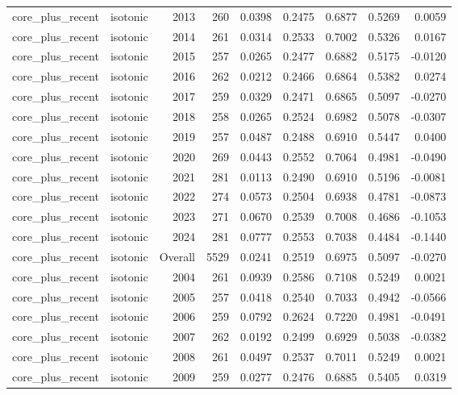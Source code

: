 \begin{table}[t]
\begin{tabular}{@{} l l r r r r r r r @{} }
      core\_plus\_recent & isotonic & 2013 & 260 & 0.0398 & 0.2475 & 0.6877 & 0.5269 & 0.0059 \\
      core\_plus\_recent & isotonic & 2014 & 261 & 0.0314 & 0.2533 & 0.7002 & 0.5326 & 0.0167 \\
      core\_plus\_recent & isotonic & 2015 & 257 & 0.0265 & 0.2477 & 0.6882 & 0.5175 & -0.0120 \\
      core\_plus\_recent & isotonic & 2016 & 262 & 0.0212 & 0.2466 & 0.6864 & 0.5382 & 0.0274 \\
      core\_plus\_recent & isotonic & 2017 & 259 & 0.0329 & 0.2471 & 0.6865 & 0.5097 & -0.0270 \\
      core\_plus\_recent & isotonic & 2018 & 258 & 0.0265 & 0.2524 & 0.6982 & 0.5078 & -0.0307 \\
      core\_plus\_recent & isotonic & 2019 & 257 & 0.0487 & 0.2488 & 0.6910 & 0.5447 & 0.0400 \\
      core\_plus\_recent & isotonic & 2020 & 269 & 0.0443 & 0.2552 & 0.7064 & 0.4981 & -0.0490 \\
      core\_plus\_recent & isotonic & 2021 & 281 & 0.0113 & 0.2490 & 0.6910 & 0.5196 & -0.0081 \\
      core\_plus\_recent & isotonic & 2022 & 274 & 0.0573 & 0.2504 & 0.6938 & 0.4781 & -0.0873 \\
      core\_plus\_recent & isotonic & 2023 & 271 & 0.0670 & 0.2539 & 0.7008 & 0.4686 & -0.1053 \\
      core\_plus\_recent & isotonic & 2024 & 281 & 0.0777 & 0.2553 & 0.7038 & 0.4484 & -0.1440 \\
      core\_plus\_recent & isotonic & Overall & 5529 & 0.0241 & 0.2519 & 0.6975 & 0.5097 & -0.0270 \\
      core\_plus\_recent & isotonic & 2004 & 261 & 0.0939 & 0.2586 & 0.7108 & 0.5249 & 0.0021 \\
      core\_plus\_recent & isotonic & 2005 & 257 & 0.0418 & 0.2540 & 0.7033 & 0.4942 & -0.0566 \\
      core\_plus\_recent & isotonic & 2006 & 259 & 0.0792 & 0.2624 & 0.7220 & 0.4981 & -0.0491 \\
      core\_plus\_recent & isotonic & 2007 & 262 & 0.0192 & 0.2499 & 0.6929 & 0.5038 & -0.0382 \\
      core\_plus\_recent & isotonic & 2008 & 261 & 0.0497 & 0.2537 & 0.7011 & 0.5249 & 0.0021 \\
      core\_plus\_recent & isotonic & 2009 & 259 & 0.0277 & 0.2476 & 0.6885 & 0.5405 & 0.0319 \\

\end{tabular}
\end{table}
